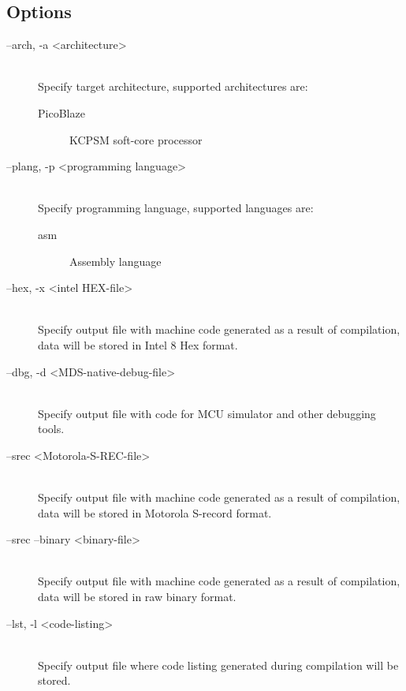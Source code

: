     \subsection{Options}
        \begin{description}
            \item[--arch, -a <architecture>]~\\
                Specify target architecture, supported architectures are:
                \begin{description}
                    \item[PicoBlaze] KCPSM soft-core processor
                \end{description}

            \item[--plang, -p <programming language>]~\\
                Specify programming language, supported languages are:
                \begin{description}
                    \item[asm] Assembly language
                \end{description}

            \item[--hex, -x <intel HEX-file>]~\\
                Specify output file with machine code generated as a result of compilation, data will be stored in Intel 8 Hex format.

            \item[--dbg, -d <MDS-native-debug-file>]~\\
                Specify output file with code for MCU simulator and other debugging tools.

            \item[--srec <Motorola-S-REC-file>]~\\
                Specify output file with machine code generated as a result of compilation, data will be stored in Motorola S-record format.

            \item[--srec --binary <binary-file>]~\\
                Specify output file with machine code generated as a result of compilation, data will be stored in raw binary format.

            \item[--lst, -l <code-listing>]~\\
                Specify output file where code listing generated during compilation will be stored.


\end{description}
